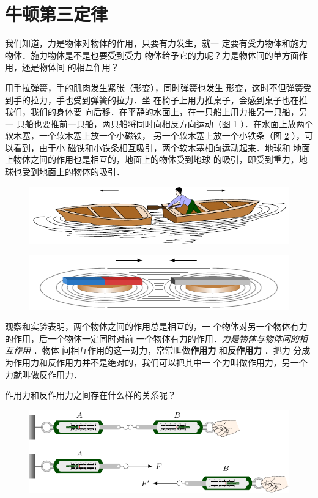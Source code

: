 \section{牛顿第三定律} 
我们知道，力是物体对物体的作用，只要有力发生，就一
定要有受力物体和施力物体．施力物体是不是也要受到受力
物体给予它的力呢？力是物体间的单方面作用，还是物体间
的相互作用？

    用手拉弹簧，手的肌肉发生紧张（形变），同时弹簧也发生
形变，这时不但弹簧受到手的拉力，手也受到弹簧的拉力．坐
在椅子上用力推桌子，会感到桌子也在推我们，我们的身体要
向后移．在平静的水面上，在一只船上用力推另一只船，另一
只船也要推前一只船，两只船将同时向相反方向运动（图 \ref{fig_A_1-13} ）．在水面上放两个软木塞，一个软木塞上放一个小磁铁，
另一个软木塞上放一个小铁条（图 \ref{fig_A_1-14} ），可以看到，由于小
磁铁和小铁条相互吸引，两个软木塞相向运动起来．地球和
地面上物体之间的作用也是相互的，地面上的物体受到地球
的吸引，即受到重力，地球也受到地面上的物体的吸引．

\begin{figure} [htp]\centering
\includegraphics{fig/A/1-13.pdf} 
\caption{} \label{fig_A_1-13} 
\end{figure} 

\begin{figure} [htp]\centering
\includegraphics{fig/A/1-14.pdf} 
\caption{} \label{fig_A_1-14} 
\end{figure} 

观察和实验表明，两个物体之间的作用总是相互的，一
个物体对另一个物体有力的作用，后一个物体一定同时对前
一个物体有力的作用．\textit{力是物体与物体间的相互作用} ．物体
间相互作用的这一对力，常常叫做\textbf{作用力} 和\textbf{反作用力} ．把力
分成为作用力和反作用力并不是绝对的，我们可以把其中一
个力叫做作用力，另一个力就叫做反作用力．

    作用力和反作用力之间存在什么样的关系呢？

\begin{figure} [htp]\centering
\includegraphics{fig/A/1-15.pdf} 
\caption{} \label{fig_A_1-15} 
\end{figure} 

